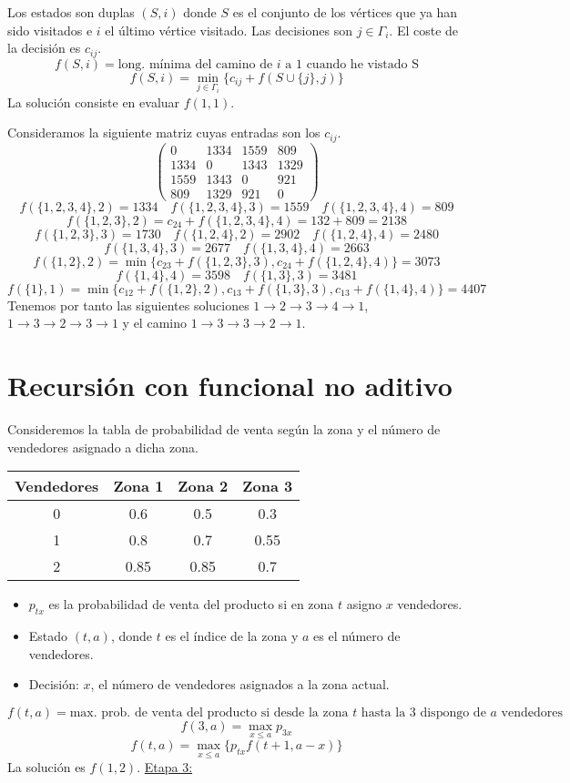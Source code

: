 \documentclass[MIOP.tex]{subfiles}
\begin{document}
Los estados son duplas $(S,i)$ donde $S$ es el conjunto de los vértices que ya han sido visitados e $i$ el último vértice visitado. Las decisiones son $j\in\Gamma_i$. El coste de la decisión es $c_{ij}$.
$$
f(S,i)= \text{long. mínima del camino de $i$ a 1 cuando he vistado S}
$$
$$f(S,i) = \min_{j\in\Gamma_i}\{c_{ij}+f(S\cup\{j\},j)\}
$$
La solución consiste en evaluar $f(1,1)$. 
\begin{ej} Consideramos la siguiente matriz cuyas entradas son los $c_{ij}$.
$$
\begin{pmatrix}
0 & 1334 & 1559 & 809\\
1334 & 0 & 1343 & 1329\\
1559 & 1343 & 0 &  921\\
809& 1329& 921 & 0
\end{pmatrix}
$$
$$
f(\{1,2,3,4\},2) = 1334 \quad f(\{1,2,3,4\},3) = 1559 \quad f(\{1,2,3,4\},4) = 809
$$
$$
f(\{1,2,3\},2) = c_{24}+ f(\{1,2,3,4\},4) = 132+809=2138
$$
$$
f(\{1,2,3\},3) = 1730 \quad f(\{1,2,4\},2) = 2902 \quad f(\{1,2,4\},4) = 2480
$$
$$
f(\{1,3,4\},3) = 2677 \quad f(\{1,3,4\},4)=2663
 $$
 $$
 f(\{1,2\},2) = \min\{c_{23}+f(\{1,2,3\},3), c_{24}+f(\{1,2,4\},4)\} = 3073
 $$
 $$
 f(\{1,4\},4) = 3598 \quad f(\{1,3\},3) = 3481
 $$
 $$
 f(\{1\},1) = \min\{c_{12}+f(\{1,2\},2), c_{13}+f(\{1,3\},3), c_{13}+f(\{1,4\},4)\} = 4407
 $$
Tenemos por tanto las siguientes soluciones $1\to 2 \to 3 \to 4 \to 1$, $1\to 3 \to 2 \to 3 \to 1$ y el camino $ 1 \to 3 \to 3 \to 2 \to 1$.
\end{ej}
\section{Recursión con funcional no aditivo}
Consideremos la tabla de probabilidad de venta según la zona y el número de vendedores asignado a dicha zona.

\begin{center}
\begin{tabular}{|c|c|c|c|}
\hline
Vendedores & Zona 1 & Zona 2 & Zona 3\\
\hline
0 & 0.6 & 0.5 & 0.3\\
\hline
1 & 0.8 & 0.7 & 0.55\\
\hline
2 & 0.85 & 0.85 & 0.7\\
\hline
\end{tabular}
\end{center}
\begin{itemize}
\item $p_{tx}$ es la probabilidad de venta del producto si en zona $t$ asigno $x$ vendedores.
\item Estado $(t,a)$, donde $t$ es el índice de la zona y $a$ es el número de vendedores.
\item Decisión: $x$, el número de vendedores asignados a la zona actual.
\end{itemize}
$$f(t,a)=\text{max. prob. de venta del producto si desde la zona $t$ hasta la 3 dispongo de $a$ vendedores}.
$$
$$f(3,a)=\max_{x\leq a} p_{3x}
$$
$$f(t,a) = \max_{x\leq a}\{p_{tx} f(t+1,a-x)\}$$
La solución es $f(1,2)$.
\newpage
\underline{Etapa 3:}\
\end{document}
